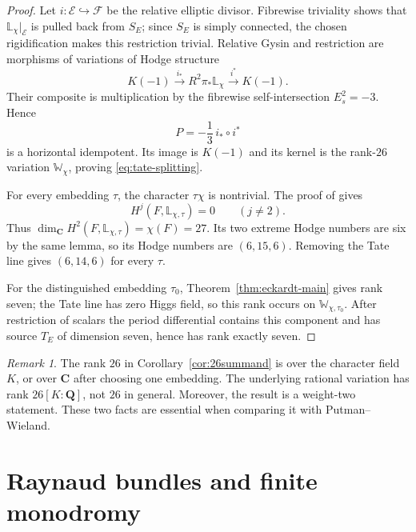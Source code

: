 \documentclass[11pt,reqno]{amsart}
\numberwithin{equation}{section}
\theoremstyle{definition}
\theoremstyle{remark}
\newtheorem{remark}[theorem]{Remark}
\newcommand{\C}{\mathbf C}
\newcommand{\Q}{\mathbf Q}
\begin{document}
\begin{proof}
Let $i:\mathscr E\hookrightarrow\mathscr F$ be the relative elliptic divisor.  Fibrewise triviality shows that $\mathbb L_\chi|_{\mathscr E}$ is pulled back from $S_E$; since $S_E$ is simply connected, the chosen rigidification makes this restriction trivial.  Relative Gysin and restriction are morphisms of variations of Hodge structure
\[
K(-1)\xrightarrow{i_*}R^2\pi_*\mathbb L_\chi
\xrightarrow{i^*}K(-1).
\]
Their composite is multiplication by the fibrewise self-intersection $E_s^2=-3$.  Hence
\[
P=-\frac13\,i_*\circ i^*
\]
is a horizontal idempotent.  Its image is $K(-1)$ and its kernel is the rank-$26$ variation $\mathbb W_\chi$, proving \eqref{eq:tate-splitting}.

For every embedding $\tau$, the character $\tau\chi$ is nontrivial.  The proof of \cite[Lemma~3.3]{KLM2026} gives
\[
H^j(F,\mathbb L_{\chi,\tau})=0\qquad(j\ne2).
\]
Thus $\dim_\C H^2(F,\mathbb L_{\chi,\tau})=\chi(F)=27$.  Its two extreme Hodge numbers are six by the same lemma, so its Hodge numbers are $(6,15,6)$.  Removing the Tate line gives $(6,14,6)$ for every $\tau$.

For the distinguished embedding $\tau_0$, Theorem~\ref{thm:eckardt-main} gives rank seven; the Tate line has zero Higgs field, so this rank occurs on $\mathbb W_{\chi,\tau_0}$.  After restriction of scalars the period differential contains this component and has source $T_E$ of dimension seven, hence has rank exactly seven.
\end{proof}

\begin{remark}\label{rem:coeff-field}
The rank $26$ in Corollary~\ref{cor:26summand} is over the character field $K$, or over $\C$ after choosing one embedding.  The underlying rational variation has rank $26[K:\Q]$, not $26$ in general.  Moreover, the result is a weight-two statement.  These two facts are essential when comparing it with Putman--Wieland.
\end{remark}

\section{Raynaud bundles and finite monodromy}\label{sec:raynaud}
\end{document}
